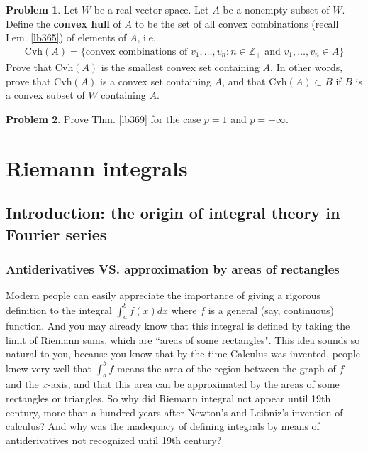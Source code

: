 \documentclass[12pt,b5paper,notitlepage]{article}
\theoremstyle{definition}
\newtheorem{prob}{\color{red}Problem}[section]
\theoremstyle{plain}
\newcommand{\Zbb}{\mathbb Z}
\numberwithin{equation}{section}
\begin{document}
\begin{prob}
Let $W$ be a real vector space. Let $A$ be a nonempty subset of $W$. Define the \textbf{convex hull}  of $A$ to be the set of all convex combinations (recall Lem. \ref{lb365}) of elements of $A$, i.e.
\begin{align}
\mathrm{Cvh}(A)=\big\{\text{convex combinations of }v_1,\dots,v_n:n\in\Zbb_+\text{ and } v_1,\dots,v_n\in A\big\}
\end{align}
Prove that $\mathrm{Cvh}(A)$ is the smallest convex set containing $A$. In other words, prove that $\mathrm{Cvh}(A)$ is a convex set containing $A$, and that $\mathrm{Cvh}(A)\subset B$ if $B$ is a convex subset of $W$ containing $A$.
\end{prob}



\begin{prob}
Prove Thm. \ref{lb369} for the case $p=1$ and $p=+\infty$.
\end{prob}












\newpage



\section{Riemann integrals}



\subsection{Introduction: the origin of integral theory in Fourier series}



\subsubsection{Antiderivatives VS. approximation by areas of rectangles}

Modern people can easily appreciate the importance of giving a rigorous definition to the integral $\int_a^bf(x)dx$ where $f$ is a general (say, continuous) function. And you may already know that this integral is defined by taking the limit of Riemann sums, which are ``areas of some rectangles". This idea sounds so natural to you, because you know that by the time Calculus was invented, people knew very well that  $\int_a^b f$ means the area of the region between the graph of $f$ and the $x$-axis, and that this area can be approximated by the areas of some rectangles or triangles. So why did Riemann integral not appear until 19th century, more than a hundred years after Newton's and Leibniz's invention of calculus? And why was the inadequacy of defining integrals by means of antiderivatives not recognized until 19th century?
\end{document}
